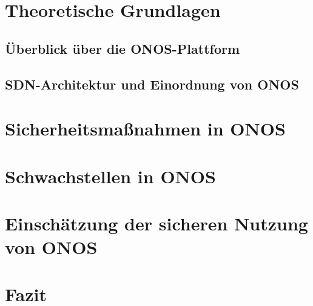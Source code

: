 \newpage

\section{Theoretische Grundlagen}

\subsection{Überblick über die ONOS-Plattform}
\cite{ohri_security_2023}
\subsection{SDN-Architektur und Einordnung von ONOS}

\newpage

\section{Sicherheitsmaßnahmen in ONOS}

\newpage
\section{Schwachstellen in ONOS}

\newpage
\section{Einschätzung der sicheren Nutzung von ONOS}

\newpage
\section{Fazit}


\pagebreak
\renewcommand\bibname{Literaturverzeichnis}


